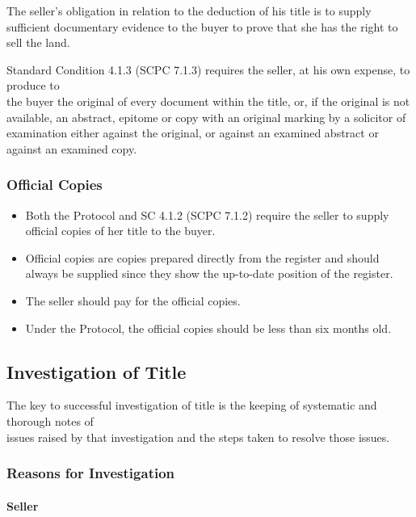 \documentclass[
]{article}
\providecommand{\tightlist}{%
  \setlength{\itemsep}{0pt}\setlength{\parskip}{0pt}}
\begin{document}
The seller's obligation in relation to the deduction of his title is to
supply sufficient documentary evidence to the buyer to prove that she
has the right to sell the land.

Standard Condition 4.1.3 (SCPC 7.1.3) requires the seller, at his own
expense, to produce to\\
the buyer the original of every document within the title, or, if the
original is not available, an abstract, epitome or copy with an original
marking by a solicitor of examination either against the original, or
against an examined abstract or against an examined copy.

\hypertarget{official-copies}{%
\subsubsection{Official Copies}\label{official-copies}}

\begin{itemize}
\tightlist
\item
  Both the Protocol and SC 4.1.2 (SCPC 7.1.2) require the seller to
  supply official copies of her title to the buyer.
\item
  Official copies are copies prepared directly from the register and
  should always be supplied since they show the up-to-date position of
  the register.
\item
  The seller should pay for the official copies.
\item
  Under the Protocol, the official copies should be less than six months
  old.
\end{itemize}

\hypertarget{investigation-of-title}{%
\subsection{Investigation of Title}\label{investigation-of-title}}

The key to successful investigation of title is the keeping of
systematic and thorough notes of\\
issues raised by that investigation and the steps taken to resolve those
issues.

\hypertarget{reasons-for-investigation}{%
\subsubsection{Reasons for
Investigation}\label{reasons-for-investigation}}

\hypertarget{seller}{%
\paragraph{Seller}\label{seller}}
\end{document}
